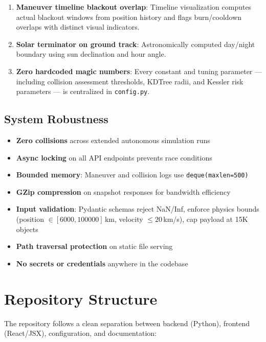 \documentclass[11pt,a4paper]{article}
\begin{document}
\begin{enumerate}
  \item \textbf{Maneuver timeline blackout overlap}: Timeline visualization
        computes actual blackout windows from position history and flags
        burn/cooldown overlaps with distinct visual indicators.

  \item \textbf{Solar terminator on ground track}: Astronomically computed
        day/night boundary using sun declination and hour angle.

  \item \textbf{Zero hardcoded magic numbers}: Every constant and tuning
        parameter --- including collision assessment thresholds, KDTree radii,
        and Kessler risk parameters --- is centralized in \texttt{config.py}.
\end{enumerate}

\subsection{System Robustness}

\begin{itemize}[nosep]
  \item \textbf{Zero collisions} across extended autonomous simulation runs
  \item \textbf{Async locking} on all API endpoints prevents race conditions
  \item \textbf{Bounded memory}: Maneuver and collision logs use \texttt{deque(maxlen=500)}
  \item \textbf{GZip compression} on snapshot responses for bandwidth efficiency
  \item \textbf{Input validation}: Pydantic schemas reject NaN/Inf, enforce physics bounds
        (position $\in [6000, 100000]$\,km, velocity $\leq 20$\,km/s), cap payload at 15K objects
  \item \textbf{Path traversal protection} on static file serving
  \item \textbf{No secrets or credentials} anywhere in the codebase
\end{itemize}

\section{Repository Structure}

The repository follows a clean separation between backend (Python), frontend
(React/JSX), configuration, and documentation:
\end{document}
